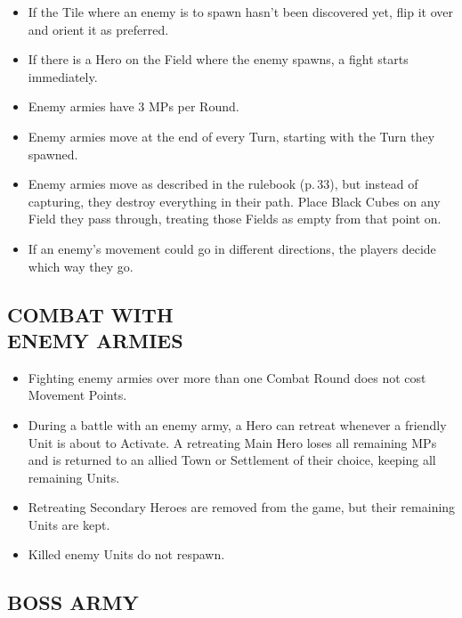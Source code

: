 \begin{multicols}{2}
\begin{itemize}
  \item If the Tile where an enemy is to spawn hasn't been discovered yet, flip it over and orient it as preferred.
  \item If there is a Hero on the Field where the enemy spawns, a fight starts immediately.

  \item Enemy armies have 3 MPs per Round.
  \item Enemy armies move at the end of every Turn, starting with the Turn they spawned.
  \item Enemy armies move as described in the rulebook (p.\,33), but instead of capturing, they destroy everything in their path.
    Place Black Cubes on any Field they pass through, treating those Fields as empty from that point on.
  \item If an enemy's movement could go in different directions, the players decide which way they go.
\end{itemize}

\subsection*{\MakeUppercase{Combat with\\Enemy Armies}}

\begin{itemize}
  \item Fighting enemy armies over more than one Combat Round does not cost Movement Points.
  \item During a battle with an enemy army, a Hero can retreat whenever a friendly Unit is about to Activate. A retreating Main Hero loses all remaining MPs and is returned to an allied Town or Settlement of their choice, keeping all remaining Units.
  \item Retreating Secondary Heroes are removed from the game, but their remaining Units are kept.
  \item Killed enemy Units do not respawn.
\end{itemize}
\vspace*{\fill}\columnbreak

\subsection*{\MakeUppercase{Boss Army}}


\end{multicols}
